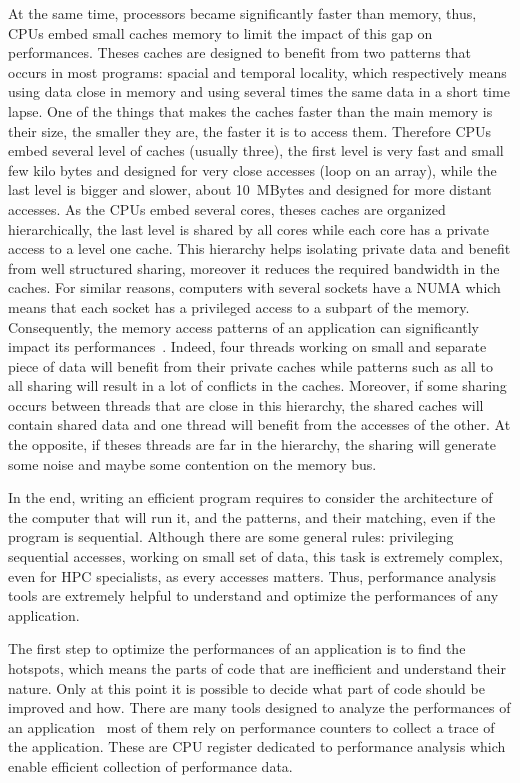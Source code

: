 At the same time, processors became significantly faster than memory, thus, \glspl{CPU} embed small caches memory to limit the impact of this gap on performances.
Theses caches are designed to benefit from two patterns that occurs in most programs: spacial and temporal locality, which respectively means using data close in memory and using several times the same data in a short time lapse.
One of the things that makes the caches faster than the main memory is their size, the smaller they are, the faster it is to access them.
Therefore \glspl{CPU} embed several level of caches (usually three), the first level is very fast and small few kilo bytes and designed for very close accesses (loop on an array), while the  last level is bigger and slower, about \SI{10}{MBytes} and designed for more distant accesses.
As the \glspl{CPU} embed several cores, theses caches are organized hierarchically, the last level is shared by all cores while each core has a private access to a level one cache.
This hierarchy helps isolating private data and benefit from well structured sharing, moreover it reduces the required bandwidth in the caches.
For similar reasons, computers with several sockets have a \gls{NUMA} which means that each socket has a privileged access to a subpart of the memory.
Consequently, the memory access patterns of an application can significantly impact its performances~\cite{Drepper07What}.
Indeed, four threads working on small and separate piece of data will benefit from their private caches while patterns such as all to all sharing will result in a lot of conflicts in the caches.
Moreover, if some sharing occurs between threads that are close in this hierarchy, the shared caches will contain shared data and one thread will benefit from the accesses of the other.
At the opposite, if theses threads are far in the hierarchy, the sharing will generate some noise and maybe some contention on the memory bus.

In the end, writing an efficient program requires to consider the architecture of the computer that will run it, and the patterns, and their matching, even if the program is sequential.
Although there are some general rules: privileging sequential accesses, working on small set of data, this task is extremely complex, even for \gls{HPC} specialists, as every accesses matters.
Thus, performance analysis tools are extremely helpful to understand and optimize the performances of any application.

The first step to optimize the performances of an application is to find the hotspots, which means the parts of code that are inefficient and understand their nature.
Only at this point it is possible to decide what part of code should be improved and how.
There are many tools designed to analyze the performances of an application~\cite{Pillet95PARAVER,Browne00Portable,Shende06Tau,Treibig10LIKWID,Adhianto10HPCTOOLKIT} most of them rely on performance counters to collect a trace of the application.
These are \gls{CPU} register dedicated to performance analysis which enable efficient collection of performance data.


